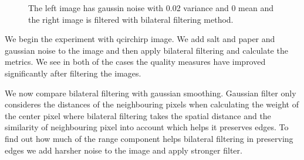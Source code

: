 \documentclass[a4paper, english]{article}
\begin{document}
\begin{figure}[H]
\centering
    \caption{The left image has gaussin noise with 0.02 variance and 0 mean and the right image is filtered with bilateral filtering method.}
\end{figure}


We begin the experiment with qcirchirp image. We add salt and paper and gaussian noise to the image and then apply bilateral filtering and calculate the metrics. We see in both of the cases the quality measures have improved significantly after filtering the images.


We now compare bilateral filtering with gaussian smoothing\cite{wiki:gaussianfilter}. Gaussian filter only consideres the distances of the neighbouring pixels when calculating the weight of the center pixel where bilateral filtering takes the spatial distance and the similarity of neighbouring pixel into account which helps it preserves edges. To find out how much of the range component helps bilateral filtering in preserving edges we add harsher noise to the image and apply stronger filter.
\end{document}
